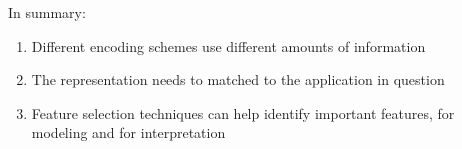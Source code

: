 In summary:
\vspace{1cm}
\pause{}
\begin{enumerate}
	\item Different encoding schemes use different amounts of information \pause{}
	\item The representation needs to matched to the application in question \pause{}
	\item Feature selection techniques can help identify important features, for modeling and for interpretation
\end{enumerate}
